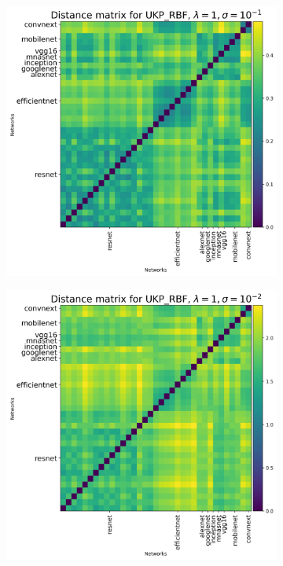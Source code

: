 \documentclass[11pt]{article}
\theoremstyle{plain}
\begin{document}
\begin{figure}[!h]
    \centering
    \begin{subfigure}[b]{0.3\textwidth}
        \includegraphics[width=\textwidth]{Appendix figures/imagenet_experiments/Heatmaps final/Heatmap for UKP_dist_RBF_1.000000e+00_1.000000e-01.png}
    \end{subfigure}
    \hfill
    \begin{subfigure}[b]{0.3\textwidth}
        \includegraphics[width=\textwidth]{Appendix figures/imagenet_experiments/Heatmaps final/Heatmap for UKP_dist_RBF_1.000000e+00_1.000000e-02.png}

\end{subfigure}
\end{figure}
\end{document}
